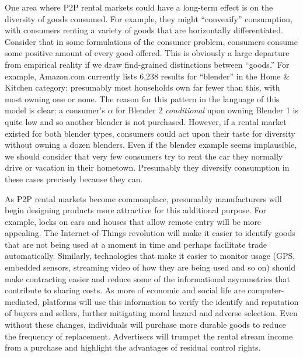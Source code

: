 \documentclass[11pt]{article}
\begin{document}
One area where P2P rental markets could have a long-term effect is on the diversity of goods consumed. 
For example, they might ``convexify'' consumption, with consumers renting a variety of goods that are horizontally differentiated.   
Consider that in some formulations of the consumer problem, consumers consume some positive amount of every good offered.
This is obviously a large departure from empirical reality if we draw find-grained distinctions between ``goods.'' 
For example, Amazon.com currently lists 6,238 results for ``blender'' in the Home \& Kitchen category: 
presumably most households own far fewer than this, with most owning one or none.
The reason for this pattern in the language of this model is clear: 
a consumer's $\alpha$ for Blender 2 \emph{conditional} upon owning Blender 1 is quite low and so another blender is not purchased.
However, if a rental market existed for both blender types, consumers could act upon their taste for diversity without owning a dozen blenders. 
Even if the blender example seems implausible, we should consider that very few consumers try to rent the car they normally drive or vacation in their hometown. 
Presumably they diversify consumption in these cases precisely because they can. 

As P2P rental markets become commonplace, presumably manufacturers will begin designing products more attractive for this additional purpose. 
For example, locks on cars and houses that allow remote entry will be more appealing. 
The Internet-of-Things revolution will make it easier to identify goods that are not being used at a moment in time and perhaps facilitate trade automatically. 
Similarly, technologies that make it easier to monitor usage (GPS, embedded sensors, streaming video of how they are being used and so on) should make contracting easier and reduce some of the informational asymmetries that contribute to sharing costs. 
As more of economic and social life are computer-mediated, platforms will use this information to verify the identify and reputation of buyers and sellers, further mitigating moral hazard and adverse selection.  
Even without these changes, individuals will purchase more durable goods to reduce the frequency of replacement. 
Advertisers will trumpet the rental stream income from a purchase and highlight the advantages of residual control rights. 






\newpage 
\end{document}
